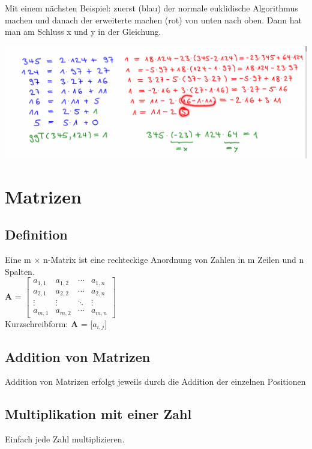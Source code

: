 \documentclass[12pt]{scrartcl}
\begin{document}
Mit einem nächsten Beispiel: zuerst (blau) der normale euklidische Algorithmus machen
und danach der erweiterte machen (rot) von unten nach oben. Dann hat man am Schluss
x und y in der Gleichung.

\includegraphics[width=14cm]{img/erweiterter_euklidischer_algorithmus_beispiel2.png}

\section{Matrizen}
\subsection{Definition}
Eine m $\times$ n-Matrix ist eine rechteckige Anordnung von Zahlen in m Zeilen und n
Spalten.\\

\renewcommand{\arraystretch}{1}
\textbf{A} = 
$
\begin{bmatrix}
    a_{1,1} & a_{1,2} & \cdots & a_{1,n}\\
    a_{2,1} & a_{2,2} & \cdots & a_{2,n}\\
    \vdots & \vdots & \ddots & \vdots\\
    a_{m,1} & a_{m,2} & \cdots & a_{m,n}
\end{bmatrix}$\\


Kurzschreibform: \textbf{A} = [$a_{i,j}$]\\


\subsection{Addition von Matrizen}

Addition von Matrizen erfolgt jeweils durch die Addition der einzelnen Positionen


\subsection{Multiplikation mit einer Zahl}
Einfach jede Zahl multiplizieren.
\end{document}
